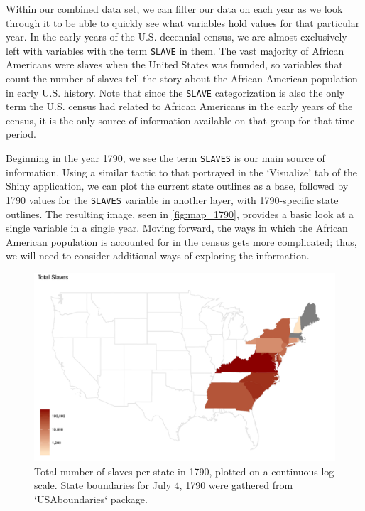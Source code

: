\documentclass[DIV=calc, paper=a4, fontsize=10pt, twocolumn]{scrartcl}\usepackage[]{graphicx}\usepackage[]{color}
\newenvironment{knitrout}{}{} %
\begin{document}
\par Within our combined data set, we can filter our data on each year as we look through it to be able to quickly see what variables hold values for that particular year. In the early years of the U.S. decennial census, we are almost exclusively left with variables with the term \texttt{SLAVE} in them. The vast majority of African Americans were slaves when the United States was founded, so variables that count the number of slaves tell the story about the African American population in early U.S. history. Note that since the \texttt{SLAVE} categorization is also the only term the U.S. census had related to African Americans in the early years of the census, it is the only source of information available on that group for that time period.  







\par Beginning in the year 1790, we see the term \texttt{SLAVES} is our main source of information. Using a similar tactic to that portrayed in the `Visualize' tab of the Shiny application, we can plot the current state outlines as a base, followed by 1790 values for the \texttt{SLAVES} variable in another layer, with 1790-specific state outlines. The resulting image, seen in \autoref{fig:map_1790}, provides a basic look at a single variable in a single year. Moving forward, the ways in which the African American population is accounted for in the census gets more complicated; thus, we will need to consider additional ways of exploring the information.  

\begin{knitrout}
\color{fgcolor}\begin{figure}[h]
\includegraphics[width=.5\textwidth]{figure/map_1790-1} \caption[Total number of slaves per state in 1790, plotted on a continuous log scale]{Total number of slaves per state in 1790, plotted on a continuous log scale. State boundaries for July 4, 1790 were gathered from `USAboundaries` package.}\label{fig:map_1790}
\end{figure}


\end{knitrout}
\end{document}
